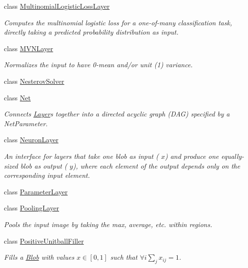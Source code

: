 \begin{DoxyCompactItemize}
class \hyperlink{classcaffe_1_1MultinomialLogisticLossLayer}{Multinomial\+Logistic\+Loss\+Layer}
\begin{DoxyCompactList}\small\item\em Computes the multinomial logistic loss for a one-\/of-\/many classification task, directly taking a predicted probability distribution as input. \end{DoxyCompactList}\item 
class \hyperlink{classcaffe_1_1MVNLayer}{M\+V\+N\+Layer}
\begin{DoxyCompactList}\small\item\em Normalizes the input to have 0-\/mean and/or unit (1) variance. \end{DoxyCompactList}\item 
class \hyperlink{classcaffe_1_1NesterovSolver}{Nesterov\+Solver}
\item 
class \hyperlink{classcaffe_1_1Net}{Net}
\begin{DoxyCompactList}\small\item\em Connects \hyperlink{classcaffe_1_1Layer}{Layer}s together into a directed acyclic graph (D\+AG) specified by a Net\+Parameter. \end{DoxyCompactList}\item 
class \hyperlink{classcaffe_1_1NeuronLayer}{Neuron\+Layer}
\begin{DoxyCompactList}\small\item\em An interface for layers that take one blob as input ( $ x $) and produce one equally-\/sized blob as output ( $ y $), where each element of the output depends only on the corresponding input element. \end{DoxyCompactList}\item 
class \hyperlink{classcaffe_1_1ParameterLayer}{Parameter\+Layer}
\item 
class \hyperlink{classcaffe_1_1PoolingLayer}{Pooling\+Layer}
\begin{DoxyCompactList}\small\item\em Pools the input image by taking the max, average, etc. within regions. \end{DoxyCompactList}\item 
class \hyperlink{classcaffe_1_1PositiveUnitballFiller}{Positive\+Unitball\+Filler}
\begin{DoxyCompactList}\small\item\em Fills a \hyperlink{classcaffe_1_1Blob}{Blob} with values $ x \in [0, 1] $ such that $ \forall i \sum_j x_{ij} = 1 $. \end{DoxyCompactList}\item 

\end{DoxyCompactItemize}
